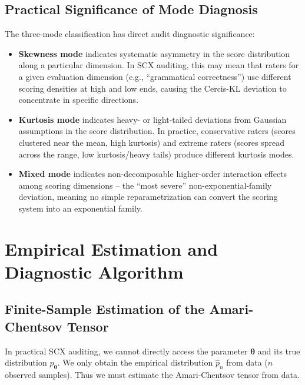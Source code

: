 \documentclass[12pt,a4paper]{article}
\theoremstyle{plain}
\theoremstyle{definition}
\theoremstyle{remark}
\newcommand{\SCX}{\textsf{SCX}}
\newcommand{\Cercis}{\textsf{Cercis}}
\begin{document}
\subsection{Practical Significance of Mode Diagnosis}

The three-mode classification has direct audit diagnostic significance:

\begin{itemize}
    \item \textbf{Skewness mode} indicates systematic asymmetry in the score distribution along a particular dimension. In \SCX{} auditing, this may mean that raters for a given evaluation dimension (e.g., ``grammatical correctness'') use different scoring densities at high and low ends, causing the \Cercis-KL deviation to concentrate in specific directions.
    \item \textbf{Kurtosis mode} indicates heavy- or light-tailed deviations from Gaussian assumptions in the score distribution. In practice, conservative raters (scores clustered near the mean, high kurtosis) and extreme raters (scores spread across the range, low kurtosis/heavy tails) produce different kurtosis modes.
    \item \textbf{Mixed mode} indicates non-decomposable higher-order interaction effects among scoring dimensions -- the ``most severe'' non-exponential-family deviation, meaning no simple reparametrization can convert the scoring system into an exponential family.
\end{itemize}

\section{Empirical Estimation and Diagnostic Algorithm}
\label{sec:algorithm}

\subsection{Finite-Sample Estimation of the Amari-Chentsov Tensor}

In practical \SCX{} auditing, we cannot directly access the parameter $\bm{\theta}$ and its true distribution $p_{\bm{\theta}}$. We only obtain the empirical distribution $\hat{p}_n$ from data ($n$ observed samples). Thus we must estimate the Amari-Chentsov tensor from data.
\end{document}
